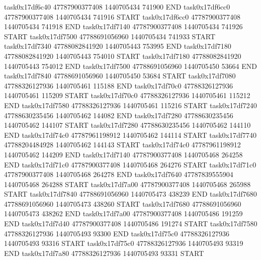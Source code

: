 task0x17df6c40 47787900377408          1440705434               741900  END
task0x17df6cc0 47787900377408          1440705434               741916  START
task0x17df6cc0 47787900377408          1440705434               741918  END
task0x17df7140 47787900377408          1440705434               741926  START
task0x17df7500 47788691056960          1440705434               741933  START
task0x17df7340 47788082841920          1440705443               753995  END
task0x17df7180 47788082841920          1440705443               754010  START
task0x17df7180 47788082841920          1440705443               754012  END
task0x17df7500 47788691056960          1440705450                53664  END
task0x17df7840 47788691056960          1440705450                53684  START
task0x17df7080 47788326127936          1440705461               115188  END
task0x17df70c0 47788326127936          1440705461               115209  START
task0x17df70c0 47788326127936          1440705461               115212  END
task0x17df7580 47788326127936          1440705461               115216  START
task0x17df7240 47788630235456          1440705462               144082  END
task0x17df7280 47788630235456          1440705462               144107  START
task0x17df7280 47788630235456          1440705462               144110  END
task0x17df74c0 47787961198912          1440705462               144114  START
task0x17df7740 47788204484928          1440705462               144143  START
task0x17df74c0 47787961198912          1440705462               144209  END
task0x17df7140 47787900377408          1440705468               264258  END
task0x17df71c0 47787900377408          1440705468               264276  START
task0x17df71c0 47787900377408          1440705468               264278  END
task0x17df7640 47787839555904          1440705468               264288  START
task0x17df7a00 47787900377408          1440705468               265988  START
task0x17df7840 47788691056960          1440705473               438239  END
task0x17df7680 47788691056960          1440705473               438260  START
task0x17df7680 47788691056960          1440705473               438262  END
task0x17df7a00 47787900377408          1440705486               191259  END
task0x17df7d40 47787900377408          1440705486               191274  START
task0x17df7580 47788326127936          1440705493                93300  END
task0x17df75c0 47788326127936          1440705493                93316  START
task0x17df75c0 47788326127936          1440705493                93319  END
task0x17df7a80 47788326127936          1440705493                93331  START
